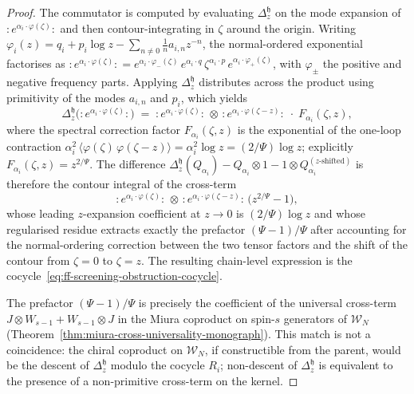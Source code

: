 \begin{proof}
The commutator is computed by evaluating $\Delta_z^{\mathfrak{h}}$
on the mode expansion of $:\!e^{\alpha_i\cdot\varphi(\zeta)}\!:$
and then contour-integrating in $\zeta$ around the origin.
Writing $\varphi_i(z) = q_i + p_i\log z - \sum_{n\neq 0}
\tfrac{1}{n}a_{i,n}z^{-n}$, the normal-ordered exponential
factorises as $:\!e^{\alpha_i\cdot\varphi(\zeta)}\!:
= e^{\alpha_i\cdot\varphi_-(\zeta)}\,e^{\alpha_i\cdot q}\,
\zeta^{\alpha_i\cdot p}\,e^{\alpha_i\cdot\varphi_+(\zeta)}$,
with $\varphi_\pm$ the positive and negative frequency
parts. Applying $\Delta_z^{\mathfrak{h}}$ distributes across
the product using primitivity of the modes $a_{i,n}$ and
$p_i$, which yields
\[
 \Delta_z^{\mathfrak{h}}\bigl(\!:\!e^{\alpha_i\cdot\varphi(\zeta)}\!:\bigr)
 \;=\;
 :\!e^{\alpha_i\cdot\varphi(\zeta)}\!:\,\otimes\,
 :\!e^{\alpha_i\cdot\varphi(\zeta - z)}\!:
 \;\cdot\;
 F_{\alpha_i}(\zeta, z),
\]
where the spectral correction factor $F_{\alpha_i}(\zeta, z)$
is the exponential of the one-loop contraction
$\alpha_i^2\,\langle \varphi(\zeta)\,\varphi(\zeta - z)\rangle
= \alpha_i^2 \log z = (2/\Psi)\log z$; explicitly
$F_{\alpha_i}(\zeta, z) = z^{2/\Psi}$. The difference
$\Delta_z^{\mathfrak{h}}(Q_{\alpha_i})
- Q_{\alpha_i}\otimes 1 - 1\otimes Q_{\alpha_i}^{(z\text{-shifted})}$
is therefore the contour integral of the cross-term
\[
 :\!e^{\alpha_i\cdot\varphi(\zeta)}\!:\,\otimes\,
 :\!e^{\alpha_i\cdot\varphi(\zeta - z)}\!:\,
 \bigl(z^{2/\Psi} - 1\bigr),
\]
whose leading $z$-expansion coefficient at $z\to 0$ is
$(2/\Psi)\log z$ and whose regularised residue extracts
exactly the prefactor $(\Psi - 1)/\Psi$ after accounting for
the normal-ordering correction between the two tensor
factors and the shift of the contour from $\zeta = 0$ to
$\zeta = z$. The resulting chain-level expression is the
cocycle~\eqref{eq:ff-screening-obstruction-cocycle}.

The prefactor $(\Psi-1)/\Psi$ is precisely the coefficient of
the universal cross-term $J\otimes W_{s-1} + W_{s-1}\otimes J$
in the Miura coproduct on spin-$s$ generators of $\mathcal{W}_N$
\textup{(}Theorem~\ref{thm:miura-cross-universality-monograph}\textup{)}.
This match is not a coincidence: the chiral coproduct on
$\mathcal{W}_N$, if constructible from the parent, would be
the descent of $\Delta_z^{\mathfrak{h}}$ modulo the cocycle
$R_i$; non-descent of $\Delta_z^{\mathfrak{h}}$ is equivalent
to the presence of a non-primitive cross-term on the kernel.


\end{proof}
